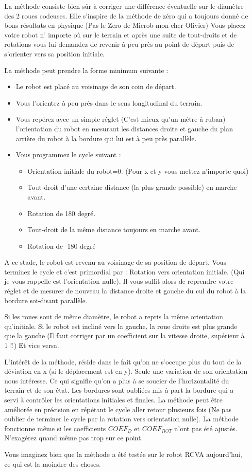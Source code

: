 \documentclass[a4paper]{report}
\begin{document}
La méthode consiste bien sûr à corriger une différence éventuelle sur le diamètre des 2 roues codeuses. Elle s’inspire de la méthode de zéro qui a toujours donné de bons résultats en physique (Pas le Zero de Microb mon cher Olivier)
Vous placez votre robot n’ importe où sur le terrain et après une suite de tout-droits et de rotations vous lui demandez de revenir à peu près au point de départ puis de s’orienter vers sa position initiale.

La méthode peut prendre la forme minimum suivante :
\begin{itemize}
\item Le robot est placé au voisinage de son coin de départ. 
\item Vous l’orientez à peu près dans le sens longitudinal du terrain.
\item Vous repérez avec un simple réglet (C’est mieux qu’un mètre à ruban) l’orientation du robot en mesurant les distances droite et gauche du plan arrière du robot à la bordure qui lui est à peu près parallèle. 
\item Vous programmez le cycle suivant :
\begin{itemize}
\item Orientation initiale du robot=0. (Pour x et y vous mettez n’importe quoi)
\item Tout-droit d’une certaine distance (la plus grande possible) en marche avant.
\item Rotation de 180 degré. 
\item Tout-droit de la même distance toujours en marche avant.
\item Rotation de -180 degré
\end{itemize}

\end{itemize}
A ce stade, le robot est revenu au voisinage de sa position de départ.
Vous terminez le cycle et c’est primordial par :
Rotation vers orientation initiale. (Qui je vous rappelle est l’orientation nulle).
Il vous suffit alors de reprendre votre réglet et de mesurer de nouveau la distance droite et gauche du cul du robot à la bordure soi-disant parallèle.

Si les roues sont de même diamètre, le robot a repris la même orientation qu’initiale.
Si le robot est incliné vers la gauche, la roue droite est plus grande que la gauche
(Il faut corriger par un coefficient sur la vitesse droite, supérieur à 1 !!)
Et vice versa.

L’intérêt de la méthode, réside dans le fait qu’on ne s’occupe plus du tout de la déviation en x (si le déplacement est en y). Seule une variation de son orientation nous intéresse. Ce qui signifie qu’on a plus à se soucier de l’horizontalité du terrain et de son état. Les bordures sont oubliées mis à part la bordure qui a servi à contrôler les orientations initiales et finales. 
La méthode peut être améliorée en précision en répétant le cycle aller retour plusieurs fois (Ne pas oublier de terminer le cycle par la rotation vers orientation nulle).
La méthode fonctionne même si les coefficients ${COEF}_D$ et ${COEF}_{ROT}$ n’ont pas été ajustés. N’exagérez quand même pas trop sur ce point.

Vous imaginez bien que la méthode a été testée sur le robot RCVA aujourd’hui, ce qui est la moindre des choses.
\end{document}
